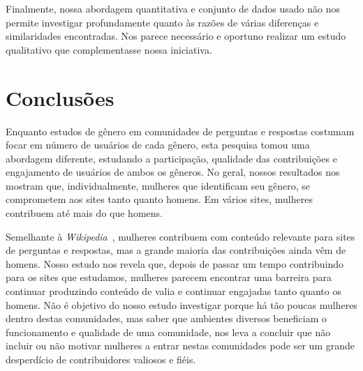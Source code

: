 
Finalmente, nossa abordagem quantitativa e conjunto de dados usado não nos permite investigar profundamente quanto às razões de várias diferenças e similaridades encontradas. Nos parece necessário e oportuno realizar um estudo qualitativo que complementasse nossa iniciativa.

\chapter{Conclusões}
\label{ch:concl}


Enquanto estudos de gênero em comunidades de perguntas e respostas costumam focar em número de usuários de cada gênero, esta pesquisa tomou uma abordagem diferente, estudando a participação, qualidade das contribuições e engajamento de usuários de ambos os gêneros. No geral, nossos resultados nos mostram que, individualmente, mulheres que identificam seu gênero, se comprometem aos sites tanto quanto homens. Em vários sites, mulheres contribuem até mais do que homens.


Semelhante à \emph{Wikipedia}~\cite{lam2011wp}, mulheres contribuem com conteúdo relevante para sites de perguntas e respostas, mas a grande maioria das contribuições ainda vêm de homens. Nosso estudo nos revela que, depois de passar um tempo contribuindo para os sites que estudamos, mulheres parecem encontrar uma barreira para continuar produzindo conteúdo de valia e continuar engajadas tanto quanto os homens. Não é objetivo do nosso estudo investigar porque há tão poucas mulheres dentro destas comunidades, mas saber que ambientes diversos beneficiam o funcionamento e qualidade de uma comunidade, nos leva a concluir que não incluir ou não motivar mulheres a entrar nestas comunidades pode ser um grande desperdício de contribuidores valiosos e fiéis.

